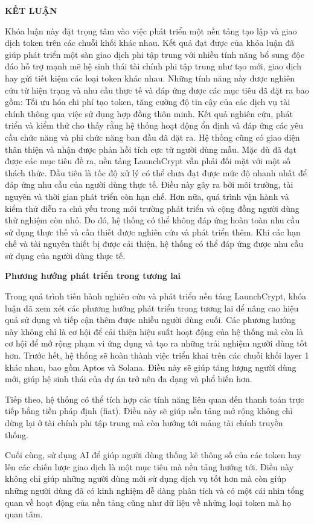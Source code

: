 \begin{center}
  \textbf{\fontsize{20}{24}\selectfont KẾT LUẬN}
\end{center}


Khóa luận này đặt trọng tâm vào việc phát triển một nền tảng tạo lập và giao
dịch token trên các chuỗi khối khác nhau. Kết quả đạt
được của khóa luận đã giúp phát triển một sàn giao dịch phi tập trung với nhiều
tính năng bổ sung độc đáo hỗ trợ mạnh mẽ hệ sinh thái tài chính phi tập trung
như tạo mới, giao dịch hay gửi tiết kiệm các loại token khác nhau. Những tính
năng này được nghiên cứu
từ hiện trạng và nhu cầu thực tế và đáp ứng được các mục tiêu đã đặt ra bao
gồm:
Tối ưu hóa chi phí tạo token, tăng cường độ tin cậy của các dịch vụ tài chính
thông qua việc sử dụng hợp đồng thôn minh.
Kết quả nghiên cứu, phát triển và kiểm thử cho thấy rằng hệ thống hoạt động ổn
định và đáp ứng các yêu cầu chức năng và phi chức năng ban đầu đã đặt ra. Hệ
thống cũng có giao diện thân thiện và nhận được phản hồi tích cực từ người dùng
mẫu.
Mặc dù đã đạt được các mục tiêu đề ra, nền tảng LaunchCrypt vẫn phải đối mặt
với một số thách thức. Đầu tiên là tốc độ xử lý có thể chưa đạt
được mức độ nhanh nhất để đáp ứng nhu cầu của người dùng thực tế. Điều này
gây ra bởi môi trường, tài nguyên và thời gian phát triển còn hạn chế. Hơn nữa,
quá trình vận hành và kiểm thử diễn ra chủ yếu trong môi trường phát triển và
cộng đồng người dùng thử nghiệm còn nhỏ. Do đó, hệ thống có thể không đáp ứng
hoàn toàn nhu cầu sử dụng thực thế và cần thiết được nghiên cứu và phát triển
thêm. Khi các hạn chế và tài nguyên thiết bị được cải thiện, hệ thống có thể
đáp
ứng được nhu cầu sử dụng của người dùng thực tế.

\hspace{-1cm}\textbf{Phương hướng phát triển trong tương lai}

Trong quá trình tiến hành nghiên cứu và phát triển nền tảng LaunchCrypt,
khóa luận đã xem xét các phương hướng phát triển trong tương lai để nâng cao
hiệu quả sử dụng và tiếp cận thêm được nhiều người dùng cuối. Các phương hướng
này không chỉ là cơ hội để cải thiện hiệu suất hoạt động của hệ thống mà còn là
cơ hội để mở rộng phạm vi ứng dụng và tạo ra những trải nghiệm người dùng tốt
hơn. Trước hết, hệ thống sẽ hoàn thành việc triển khai trên các chuỗi khối
layer 1 khác nhau, bao gồm Aptos và Solana. Điều này sẽ giúp tăng lượng người
dùng mới, giúp hệ sinh thái của dự án trở nên đa dạng và phổ biến hơn.

\hspace{-1cm}Tiếp theo, hệ thống có thể tích hợp các tính năng liên quan đến
thanh toán trực tiếp bằng tiền pháp định (fiat). Điều này sẽ giúp nền tảng mở
rộng không chỉ dừng lại ở tài chính phi tập trung mà còn hướng tới mảng tài
chính truyền thống.

\hspace{-1cm}Cuối cùng, sử dụng AI để giúp người dùng thống kê thông số của các
token hay lên các chiến lược giao dịch là một mục tiêu mà nền tảng hướng tới.
Điều này không chỉ giúp những người dùng mới sử dụng dịch vụ tốt hơn mà còn
giúp những người dùng đã có kinh nghiệm dễ dàng phân tích và có một cái nhìn
tổng quan về hoạt động của nền tảng cũng như dữ liệu về những loại token mà họ
quan tâm.
